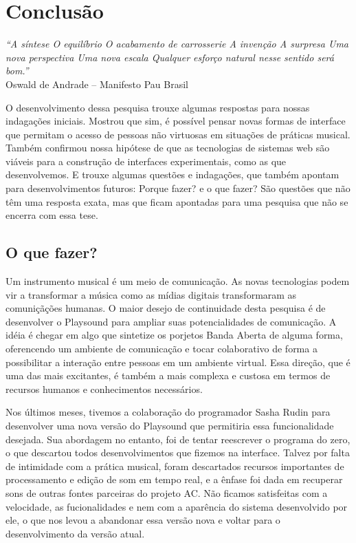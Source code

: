
\chapter{Conclusão}
\label{ch:conclusao}
\begin{flushright}
\textit{``A síntese
O equilíbrio
O acabamento de carrosserie
A invenção
A surpresa
Uma nova perspectiva
Uma nova escala
Qualquer esforço natural nesse sentido será bom.''} \\
Oswald de Andrade – Manifesto Pau Brasil    
\end{flushright}

O desenvolvimento dessa pesquisa trouxe algumas respostas para nossas indagações iniciais. Mostrou que sim, é possível pensar novas formas de interface que permitam o acesso de pessoas não virtuosas em situações de práticas musical. Também confirmou nossa hipótese de que as tecnologias de sistemas web são viáveis para a construção de interfaces experimentais, como as que desenvolvemos. E trouxe algumas questões e indagações, que também apontam para desenvolvimentos futuros: Porque fazer? e o que fazer? São questões que não têm uma resposta exata, mas que ficam apontadas para uma pesquisa que não se encerra com essa tese.


\section{O que fazer?}

Um instrumento musical é um meio de comunicação. As novas tecnologias podem vir a transformar a música como as mídias digitais transformaram as comuniçãções humanas. O maior desejo de continuidade desta pesquisa é de desenvolver o Playsound para ampliar suas potencialidades de comunicação. A idéia é chegar em algo que sintetize os porjetos Banda Aberta de alguma forma, oferencendo um ambiente de comunicação e tocar colaborativo de forma a possibilitar a interação entre pessoas em um ambiente virtual. Essa direção, que é uma das mais excitantes, é também a mais complexa e custosa em termos de recursos humanos e conhecimentos necessários.

Nos últimos meses, tivemos a colaboração do programador Sasha Rudin para desenvolver uma nova versão do Playsound que permitiria essa funcionalidade desejada. Sua abordagem no entanto, foi de tentar reescrever o programa do zero, o que descartou todos desenvolvimentos que fizemos na interface. Talvez por falta de intimidade com a prática musical, foram descartados recursos importantes de processamento e edição de som em tempo real, e a ênfase foi dada em recuperar sons de outras fontes parceiras do projeto AC. Não ficamos satisfeitas com a velocidade, as fucionalidades e nem com a aparência do sistema desenvolvido por ele, o que nos levou a abandonar essa versão nova e voltar para o desenvolvimento da versão atual. 

